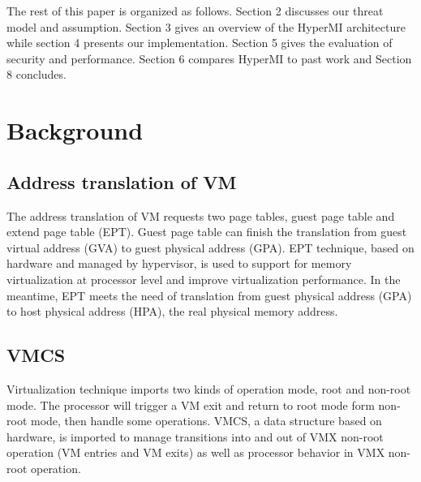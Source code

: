 \documentclass[conference]{IEEEtran}
\begin{document}

The rest of this paper is organized as follows. Section 2 discusses our threat model and assumption. Section 3 gives an overview of the HyperMI architecture while section 4 presents our implementation. Section 5 gives the evaluation of security and performance. Section 6 compares HyperMI to past work and Section 8 concludes.



\iffalse
\section{Background}
\subsection{Address translation of VM}
The address translation of VM requests two page tables, guest page table and extend page table (EPT). Guest page table can finish the translation from guest virtual address (GVA) to guest physical address (GPA). EPT technique, based on hardware and managed by hypervisor, is used to support for memory virtualization at processor level and improve virtualization performance. In the meantime, EPT meets the need of translation from guest physical address (GPA) to host physical address (HPA), the real physical memory address. 

\subsection{VMCS}
Virtualization technique imports two kinds of operation mode, root and non-root mode. The processor will trigger a VM exit and return to root mode form non-root mode, then handle some operations. VMCS, a data structure based on hardware, is imported to manage transitions into and out of VMX non-root operation (VM entries and VM exits) as well as processor behavior in VMX non-root operation.

\iffalse
\end{document}
